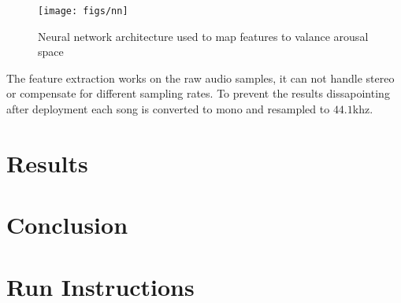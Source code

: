 \documentclass[lang=en, hanging-titles=true]{skrapport}
\begin{document}
\begin{figure}[h]
	\centering
	\texttt{[image: figs/nn]}
	\caption{Neural network architecture used to map features to valance arousal space}
	\label{fig:nn}
\end{figure}

The feature extraction works on the raw audio samples, it can not handle stereo or compensate for different sampling rates. To prevent the results dissapointing after deployment each song is converted to mono and resampled to $44.1$khz.

\section{Results}
\section{Conclusion}

\clearpage
\appendix
\section{Run Instructions}
\printbibliography
\end{document}
